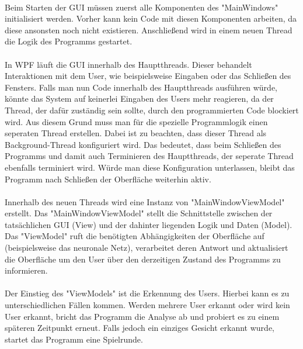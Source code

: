 \documentclass[12pt,a4paper,headinclude,twoside, plainheadsepline, open=right,numbers=noenddot]{scrreprt}
\begin{document}
\paragraph{}
Beim Starten der GUI müssen zuerst alle Komponenten des "{}MainWindows"{} initialisiert werden. Vorher kann kein Code mit diesen Komponenten arbeiten, da diese ansonsten noch nicht existieren. Anschließend wird in einem neuen Thread die Logik des Programms gestartet.
\paragraph{}
In WPF läuft die GUI innerhalb des Hauptthreads. Dieser behandelt Interaktionen mit dem User, wie beispielsweise Eingaben oder das Schließen des Fensters. Falls man nun Code innerhalb des Hauptthreads ausführen würde, könnte das System auf keinerlei Eingaben des Users mehr reagieren, da der Thread, der dafür zuständig sein sollte, durch den programmierten Code blockiert wird. Aus diesem Grund muss man für die spezielle Programmlogik einen seperaten Thread erstellen. Dabei ist zu beachten, dass dieser Thread als Background-Thread konfiguriert wird. Das bedeutet, dass beim Schließen des Programms und damit auch Terminieren des Hauptthreads, der seperate Thread ebenfalls terminiert wird. Würde man diese Konfiguration unterlassen, bleibt das Programm nach Schließen der Oberfläche weiterhin aktiv.
\paragraph{}
Innerhalb des neuen Threads wird eine Instanz von "{}MainWindowViewModel"{} erstellt. Das "{}MainWindowViewModel"{} stellt die Schnittstelle zwischen der tatsächlichen GUI (View) und der dahinter liegenden Logik und Daten (Model). Das "{}ViewModel"{} ruft die benötigten Abhängigkeiten der Oberfläche auf (beispielsweise das neuronale Netz), verarbeitet deren Antwort und aktualisiert die Oberfläche um den User über den derzeitigen Zustand des Programms zu informieren. 
\paragraph{}
Der Einstieg des "{}ViewModels"{} ist die Erkennung des Users. Hierbei kann es zu unterschiedlichen Fällen kommen. Werden mehrere User erkannt oder wird kein User erkannt, bricht das Programm die Analyse ab und probiert es zu einem späteren Zeitpunkt erneut. Falls jedoch ein einziges Gesicht erkannt wurde, startet das Programm eine Spielrunde.
\end{document}
